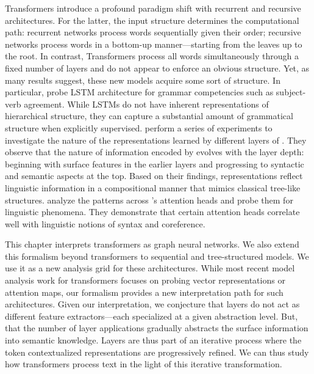 Transformers introduce a profound paradigm shift with recurrent and recursive architectures. For the latter, the input structure determines the computational path: recurrent networks process words sequentially given their order; recursive networks process words in a bottom-up manner—starting from the leaves up to the root. In contrast, Transformers process all words simultaneously through a fixed number of layers and do not appear to enforce an obvious structure. Yet, as many results suggest, these new models acquire some sort of structure.
In particular, \textcite{linzen_16} probe LSTM architecture for grammar competencies such as subject-verb agreement. While LSTMs do not have inherent representations of hierarchical structure, they can capture a substantial amount of grammatical structure when explicitly supervised. 
\textcite{jawahar_19} perform a series of experiments to investigate the nature of the representations learned by different layers of \bert. They observe that the nature of information encoded by \bert evolves with the layer depth: beginning with surface features in the earlier layers and progressing to syntactic and semantic aspects at the top. Based on their findings, \bert representations reflect linguistic information in a compositional manner that mimics classical tree-like structures.
\textcite{clark_19} analyze the patterns across \bert’s attention heads and probe them for linguistic phenomena. They demonstrate that certain attention heads correlate well with linguistic notions of syntax and coreference.

This chapter interprets transformers as graph neural networks. We also extend this formalism beyond transformers to sequential and tree-structured models. We use it as a new analysis grid for these architectures. While most recent model analysis work for transformers focuses on probing vector representations or attention maps, our formalism provides a new interpretation path for such architectures. Given our interpretation, we conjecture that layers do not act as different feature extractors—each specialized at a given abstraction level. But, that the number of layer applications gradually abstracts the surface information into semantic knowledge. Layers are thus part of an iterative process where the token contextualized representations are progressively refined. We can thus study how transformers process text in the light of this iterative transformation.

